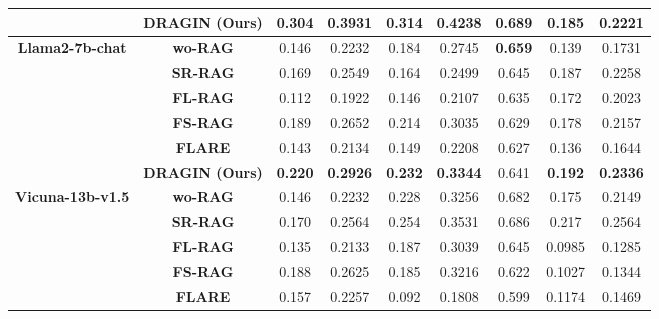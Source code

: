 \begin{table*}[t]
\begin{tabular}{ccccccccc}
                                          & \textbf{DRAGIN (Ours)} & \textbf{0.304}& \textbf{0.3931}& \textbf{0.314}& \textbf{0.4238}& \textbf{0.689}& 0.185& 0.2221\\
                                          \toprule
\multirow{6}{*}{\textbf{Llama2-7b-chat}}  & \textbf{wo-RAG} & 0.146                & 0.2232                & 0.184             & 0.2745            & \textbf{0.659}      & 0.139& 0.1731          \\
                                          & \textbf{SR-RAG}  & 0.169                & 0.2549                & 0.164             & 0.2499            & 0.645               & 0.187& 0.2258          \\
                                          & \textbf{FL-RAG} & 0.112                & 0.1922                & 0.146             & 0.2107            & 0.635               & 0.172& 0.2023          \\
                                          & \textbf{FS-RAG} & 0.189                & 0.2652                & 0.214             & 0.3035            & 0.629               & 0.178& 0.2157          \\
                                                                                    & \textbf{FLARE}  & 0.143                & 0.2134                & 0.149             & 0.2208            & 0.627               & 0.136& 0.1644          \\
                                                                                    
                                          & \textbf{DRAGIN (Ours)} & \textbf{0.220}& \textbf{0.2926}& \textbf{0.232}& \textbf{0.3344}& 0.641               & \textbf{0.192}& \textbf{0.2336}\\
                                          \toprule
\multirow{6}{*}{\textbf{Vicuna-13b-v1.5}} & \textbf{wo-RAG} & 0.146                & 0.2232                & 0.228             & 0.3256            & 0.682               & 0.175& 0.2149          \\
                                          & \textbf{SR-RAG}  & 0.170                 & 0.2564                & 0.254             & 0.3531            & {0.686}      & 0.217           & 0.2564          \\
                                          & \textbf{FL-RAG} & 0.135                & 0.2133                & 0.187             & 0.3039            & 0.645               & 0.0985          & 0.1285          \\
                                          & \textbf{FS-RAG} & 0.188                & 0.2625                & 0.185             & 0.3216            & 0.622               & 0.1027          & 0.1344          \\
                                                                                    & \textbf{FLARE}  & 0.157                & 0.2257                & 0.092             & 0.1808            & 0.599               & 0.1174          & 0.1469          \\


\end{tabular}
\end{table*}
